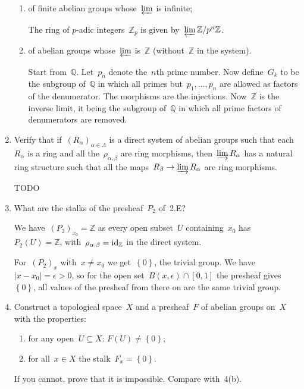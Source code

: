\documentclass[a4paper,11pt]{article}
\begin{document}
\begin{enumerate}
\begin{enumerate}
      \item of finite abelian groups whose~$\varprojlim$ is infinite;

        \begin{solution}
          The ring of $p$\nobreakdash-adic integers~$\mathbb{Z}_p$ is given by~$\varprojlim\mathbb{Z}/p^n\mathbb{Z}$.
        \end{solution}

      \item of abelian groups whose~$\varprojlim$ is~$\mathbb{Z}$ (without~$\mathbb{Z}$ in the system).

        \begin{solution}
          Start from~$\mathbb{Q}$. Let~$p_n$ denote the~$n$th prime number. Now define~$G_k$ to be the subgroup of~$\mathbb{Q}$ in which all primes but~$p_1,\ldots,p_n$ are allowed as factors of the denumerator. The morphisms are the injections. Now~$\mathbb{Z}$ is the inverse limit, it being the subgroup of~$\mathbb{Q}$ in which all prime factors of denumerators are removed.
        \end{solution}
    \end{enumerate}

  \item Verify that if~$(R_\alpha)_{\alpha\in\Lambda}$ is a direct system of abelian groups such that each~$R_\alpha$ is a ring and all the~$\rho_{\alpha,\beta}$ are ring morphisms, then~$\varinjlim R_\alpha$ has a natural ring structure such that all the maps~$R_\beta\to\varinjlim R_\alpha$ are ring morphisms.

    \begin{solution}
      TODO
    \end{solution}

  \item What are the stalks of the presheaf~$P_2$ of~2.E?

    \begin{solution}
      We have~$(P_2)_{x_0}=\mathbb{Z}$ as every open subset~$U$ containing~$x_0$ has~$P_2(U)=\mathbb{Z}$, with~$\rho_{\alpha,\beta}=\operatorname{id}_{\mathbb{Z}}$ in the direct system.

      For~$(P_2)_{x}$ with~$x\neq x_0$ we get~$\left\{ 0 \right\}$, the trivial group. We have~$|x-x_0|=\epsilon>0$, so for the open set~$B(x,\epsilon)\cap[0,1]$ the presheaf gives~$\left\{ 0 \right\}$, all values of the presheaf from there on are the same trivial group.
    \end{solution}

  \item Construct a topological space~$X$ and a presheaf~$F$ of abelian groups on~$X$ with the properties:
    \begin{enumerate}
      \item for any open~$U\subseteq X$: $F(U)\neq\left\{ 0 \right\}$;
      \item for all~$x\in X$ the stalk~$F_x=\left\{ 0 \right\}$.
    \end{enumerate}
    If you cannot, prove that it is impossible. Compare with~4(b).


\end{enumerate}
\end{document}
